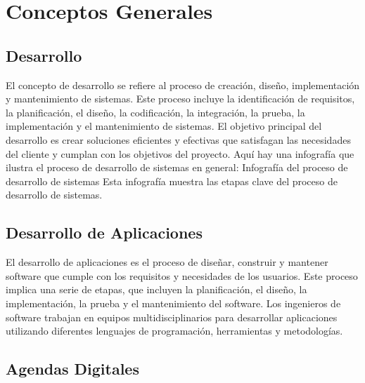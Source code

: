 \section{Conceptos Generales}
\subsection{Desarrollo}
\hspace{1.27cm}El concepto de desarrollo se refiere al proceso de creación, diseño, implementación y mantenimiento de sistemas. Este proceso incluye la identificación de requisitos, la planificación, el diseño, la codificación, la integración, la prueba, la implementación y el mantenimiento de sistemas. El objetivo principal del desarrollo es crear soluciones eficientes y efectivas que satisfagan las necesidades del cliente y cumplan con los objetivos del proyecto.
Aquí hay una infografía que ilustra el proceso de desarrollo de sistemas en general: Infografía del proceso de desarrollo de sistemas
Esta infografía muestra las etapas clave del proceso de desarrollo de sistemas.
\subsection{Desarrollo de Aplicaciones}
\hspace{1.27cm}El desarrollo de aplicaciones es el proceso de diseñar, construir y mantener software que cumple con los requisitos y necesidades de los usuarios. Este proceso implica una serie de etapas, que incluyen la planificación, el diseño, la implementación, la prueba y el mantenimiento del software.
Los ingenieros de software trabajan en equipos multidisciplinarios para desarrollar 	aplicaciones utilizando diferentes lenguajes de programación, herramientas y metodologías.
\subsection{Agendas Digitales}

